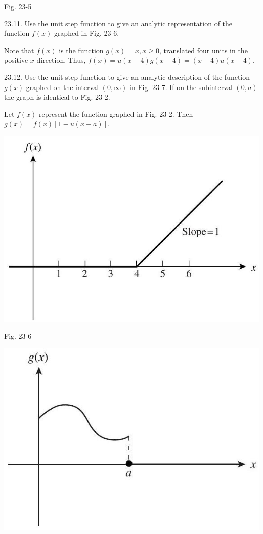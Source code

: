 \documentclass[10pt]{article}
\begin{document}
Fig. 23-5

23.11. Use the unit step function to give an analytic representation of the function $f(x)$ graphed in Fig. 23-6.

Note that $f(x)$ is the function $g(x)=x, x \geq 0$, translated four units in the positive $x$-direction. Thus, $f(x)=u(x-4) g(x-4)=(x-4) u(x-4)$.

23.12. Use the unit step function to give an analytic description of the function $g(x)$ graphed on the interval $(0, \infty)$ in Fig. 23-7. If on the subinterval $(0, a)$ the graph is identical to Fig. 23-2.

Let $f(x)$ represent the function graphed in Fig. 23-2. Then $g(x)=f(x)[1-u(x-a)]$.

\begin{center}
\includegraphics[max width=\textwidth]{2024_04_03_5bb5b4275a64cb9887d1g-256(1)}
\end{center}

Fig. 23-6

\begin{center}
\includegraphics[max width=\textwidth]{2024_04_03_5bb5b4275a64cb9887d1g-256}
\end{center}
\end{document}
